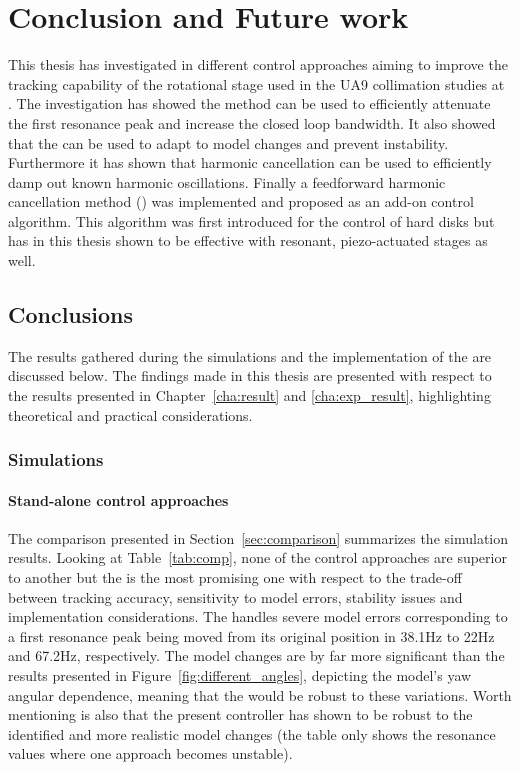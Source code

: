 \chapter{Conclusion and Future work}\label{cha:conclusion}
This thesis has investigated in different control approaches aiming to improve the tracking capability of the rotational stage used in the UA9 collimation studies at \abbrCERN. The investigation has showed the \abbrIRC method can be used to efficiently attenuate the first resonance peak and increase the closed loop bandwidth. It also showed that the \abbrMRACPE can be used to adapt to model changes and prevent instability. Furthermore it has shown that harmonic cancellation can be used to efficiently damp out known harmonic oscillations. Finally a feedforward harmonic cancellation method (\abbrRFDC) was implemented and proposed as an add-on control algorithm. This algorithm was first introduced for the control of hard disks but has in this thesis shown to be effective with resonant, piezo-actuated stages as well.

\section{Conclusions}
The results gathered during the simulations and the implementation of the \abbrRFDC are discussed below. The findings made in this thesis are presented with respect to the results presented in Chapter~\ref{cha:result} and \ref{cha:exp_result}, highlighting theoretical and practical considerations.

\subsection{Simulations}
\subsubsection{Stand-alone control approaches}
The comparison presented in Section~\ref{sec:comparison} summarizes the simulation results. Looking at Table~\ref{tab:comp}, none of the control approaches are superior to another but the \abbrIRC is the most promising one with respect to the trade-off between tracking accuracy, sensitivity to model errors, stability issues and implementation considerations. The \abbrIRC handles severe model errors corresponding to a first resonance peak being moved from its original position in 38.1Hz to 22Hz and 67.2Hz, respectively. The model changes are by far more significant than the results presented in Figure~\ref{fig:different_angles}, depicting the model's yaw angular dependence, meaning that the \abbrIRC would be robust to these variations. Worth mentioning is also that the present controller has shown to be robust to the identified and more realistic model changes (the table only shows the resonance values where one approach becomes unstable).

